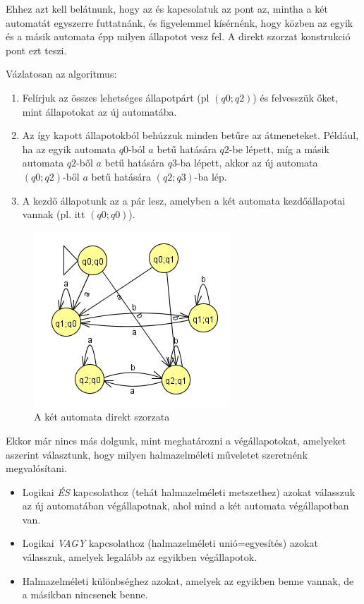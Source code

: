 \documentclass[12pt]{report}
\theoremstyle{definition}
\begin{document}
Ehhez azt kell belátnunk, hogy az és kapcsolatuk az pont az, mintha a két automatát egyszerre futtatnánk, és figyelemmel kísérnénk, hogy közben az egyik és a másik automata épp milyen állapotot vesz fel. A direkt szorzat konstrukció pont ezt teszi.

Vázlatosan az algoritmus:
\begin{enumerate}
            \item Felírjuk az összes lehetséges állapotpárt (pl $(q0;q2)$) és felvesszük őket, mint állapotokat az új automatába.
            \item Az így kapott állapotokból behúzzuk minden betűre az átmeneteket. Például, ha az egyik automata $q0$-ból $a$ betű hatására $q2$-be lépett, míg a másik automata $q2$-ből $a$ betű hatására $q3$-ba lépett, akkor az új automata $(q0;q2)$-ből $a$ betű hatására $(q2;q3)$-ba lép.
            \item A kezdő állapotunk az a pár lesz, amelyben a két automata kezdőállapotai vannak  (pl. itt $(q0;q0)$).
\end{enumerate}

\begin{figure}[H]
\centering
\includegraphics[scale=1]{direkt_a-val_kezdodik_szorzat_b_re_vegzodik.png}
\caption{\label{direkt3} A két automata direkt szorzata}
\end{figure}

Ekkor már nincs más dolgunk, mint meghatározni a végállapotokat, amelyeket aszerint választunk, hogy milyen halmazelméleti műveletet szeretnénk megvalósítani.

\begin{itemize}
\item Logikai \textit{ÉS} kapcsolathoz (tehát halmazelméleti metszethez) azokat válasszuk az új automatában végállapotnak, ahol mind a két automata végállapotban van.
\item Logikai \textit{VAGY} kapcsolathoz (halmazelméleti unió=egyesítés) azokat válasszuk, amelyek legalább az egyikben végállapotok.
\item Halmazelméleti különbséghez azokat, amelyek az egyikben benne vannak, de a másikban nincsenek benne.
\end{itemize}
\end{document}
